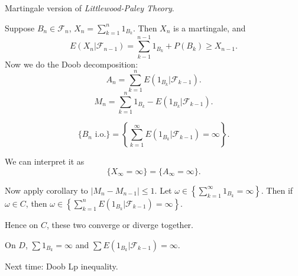 Martingale version of \textit{Littlewood-Paley Theory}.

\begin{example}
	Suppose $B_n \in \mathcal{F}_n$, $X_n = \sum_{k = 1}^n 1_{B_k}$. Then $X_n$ is a martingale, and
	\[
		E\left( X_n | \mathcal{F}_{n-1 } \right) = \sum_{k - 1}^{n - 1 }1_{B_k } + P(B_k) \ge X_{n-1}
	.\] 
	Now we do the Doob decomposition:
	\[
		A_n = \sum_{k = 1}^n E\left( 1_{B_k} | \mathcal{F}_{k-1} \right) 
	.\] 
	\[
		M_n = \sum_{k = 1}^n 1_{B_k} - E\left( 1_{B_k} | \mathcal{F}_{k-1} \right) 
	.\] 

\begin{theorem}
	\[
		\{B_n \text{ i.o.}\} 
		=
		\left\{\sum_{k = 1}^\infty  E(1_{B_k} | \mathcal{F}_{k-1}) = \infty \right\} 
	.\] 
\end{theorem}
We can interpret it as
\[
	\{X_\infty = \infty \} = \{A_\infty  = \infty \}  
.\] 

\end{example}

Now apply corollary to $|M_n - M_{n-1}|\le 1$. Let $\omega \in \left\{\sum_{k = 1}^\infty 1_{B_k} = \infty  \right\} $. Then if $\omega \in C$, then $\omega \in \left\{ \sum_{k = 1}^n E(1_{B_k} | \mathcal{F}_{k-1}) = \infty  \right\} $.

Hence on $C$, these two converge or diverge together.

On $D$, $\sum 1_{B_k} = \infty $ and $\sum E(1_{B_k}|\mathcal{F}_{k-1}) = \infty $. 

Next time: Doob Lp inequality.
